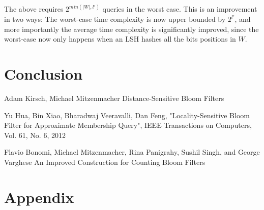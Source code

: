 \documentclass[a4paper,11pt]{article}
\begin{document}
The above requires $2^{min(|W|, l')}$ queries in the worst case.
This is an improvement in two ways: The worst-case time complexity is now upper bounded by $2^{l'}$, and more importantly the average time complexity is significantly improved, since the worst-case now only happens when an LSH hashes all the bits positions in $W$.








\section{Conclusion}
\newpage

\begin{thebibliography}{}

Adam Kirsch, Michael Mitzenmacher
Distance-Sensitive Bloom Filters

Yu Hua, Bin Xiao, Bharadwaj Veeravalli, Dan Feng, "Locality-Sensitive Bloom Filter for Approximate Membership Query", IEEE Transactions on Computers, Vol. 61, No. 6, 2012


Flavio Bonomi, Michael Mitzenmacher, Rina Panigrahy, Sushil Singh, and George Varghese
An Improved Construction for Counting Bloom Filters

\end{thebibliography}

\section*{Appendix}
%
\end{document}
